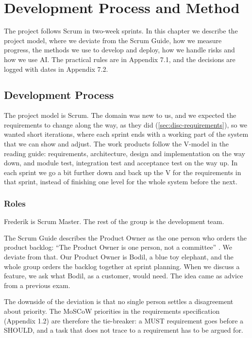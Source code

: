 \chapter{Development Process and Method}\label{ch:method}

The project follows Scrum \cite{schwaber-scrum-guide-2016} in two-week sprints. In
this chapter we describe the project model, where we deviate from the Scrum Guide,
how we measure progress, the methods we use to develop and deploy, how we handle risks
and how we use AI. The
practical rules are in Appendix 7.1, and the decisions are logged with dates in
Appendix 7.2.

\section{Development Process}\label{sec:method-process}

The project model is Scrum. The domain was new to us, and we expected the requirements
to change along the way, as they did (\autoref{sec:disc-requirements}), so we wanted short iterations, where each sprint ends with
a working part of the system that we can show and adjust. The work products follow
the V-model in the reading guide: requirements, architecture, design and
implementation on the way down, and module test, integration test and acceptance test
on the way up. In each sprint we go a bit further down and back up the V for the
requirements in that sprint, instead of finishing one level for the whole system
before the next.

\subsection{Roles}\label{sec:method-roles}

Frederik is Scrum Master. The rest of the group is the development team.

The Scrum Guide describes the Product Owner as the one person who orders the product
backlog: ``The Product Owner is one person, not a committee''
\cite[p.~5]{schwaber-scrum-guide-2016}. We deviate from that. Our Product Owner is
Bodil, a blue toy elephant, and the whole group orders the backlog together at
sprint planning. When we discuss a feature, we ask what Bodil, as a customer, would
need. The idea came as advice from a previous exam.

The downside of the deviation is that no single person settles a disagreement about
priority. The MoSCoW priorities in the requirements specification (Appendix 1.2) are
therefore the tie-breaker: a MUST requirement goes before a SHOULD, and a task that
does not trace to a requirement has to be argued for.

